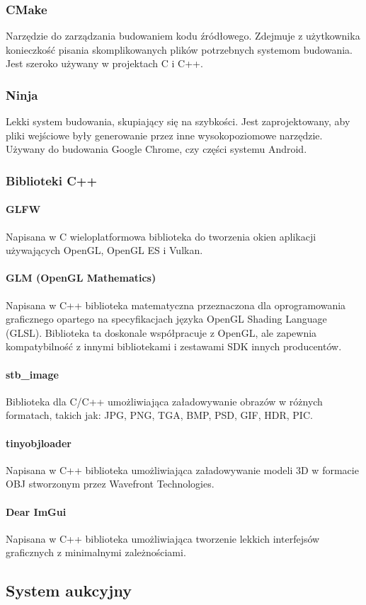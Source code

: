   \subsubsection{CMake}
  Narzędzie do zarządzania budowaniem kodu źródłowego. Zdejmuje z użytkownika konieczkość pisania skomplikowanych plików potrzebnych systemom budowania. Jest szeroko używany w projektach C i C++.

  \subsubsection{Ninja}
  Lekki system budowania, skupiający się na szybkości. Jest zaprojektowany, aby pliki wejściowe były generowanie przez inne wysokopoziomowe narzędzie. Używany do budowania Google Chrome, czy części systemu Android.

  \subsubsection{Biblioteki C++}
    \paragraph{GLFW} Napisana w C wieloplatformowa biblioteka do tworzenia okien aplikacji używających OpenGL, OpenGL ES i Vulkan.
    \paragraph{GLM (OpenGL Mathematics)} Napisana w C++ biblioteka matematyczna przeznaczona dla oprogramowania graficznego opartego na specyfikacjach języka OpenGL Shading Language (GLSL). Biblioteka ta doskonale współpracuje z OpenGL, ale zapewnia kompatybilność z innymi bibliotekami i zestawami SDK innych producentów. 
    \paragraph{stb\_image} Biblioteka dla C/C++ umożliwiająca załadowywanie obrazów w różnych formatach, takich jak: JPG, PNG, TGA, BMP, PSD, GIF, HDR, PIC.
    \paragraph{tinyobjloader} Napisana w C++ biblioteka umożliwiająca załadowywanie modeli 3D w formacie OBJ stworzonym przez Wavefront Technologies.
    \paragraph{Dear ImGui} Napisana w C++ biblioteka umożliwiająca tworzenie lekkich interfejsów graficznych z minimalnymi zależnościami.

\subsection{System aukcyjny}

  \tcbox{\dots}
